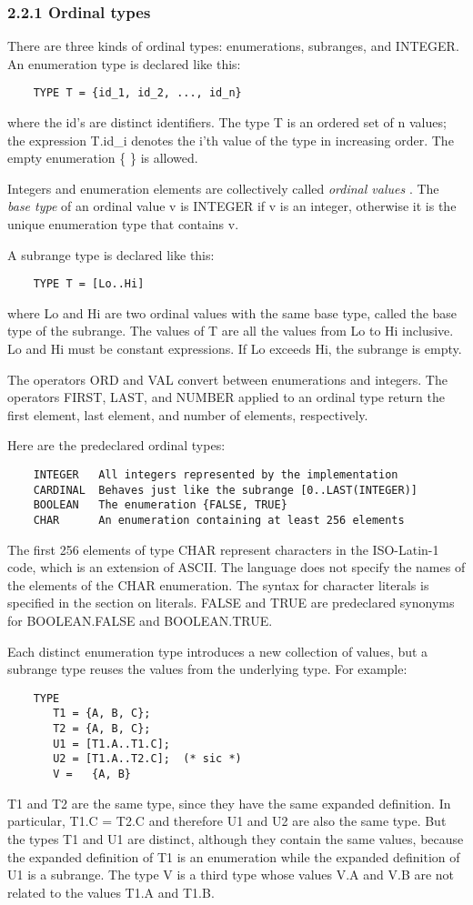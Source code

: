 \documentclass[10pt]{article}
\begin{document}
\subsubsection*{2.2.1 Ordinal types}

There are three kinds of ordinal types: enumerations, subranges, and
INTEGER.  An enumeration type is declared like this:
\begin{verbatim}
    TYPE T = {id_1, id_2, ..., id_n}
\end{verbatim}
where the id's are distinct identifiers.  The type T is an ordered set of n
values; the expression T.id\_i denotes the i'th value of the type in
increasing order.  The empty enumeration \{ \} is allowed.

Integers and enumeration elements are collectively called \emph{ordinal
  values} .  The \emph{base type} of an ordinal value v is INTEGER if v is an
integer, otherwise it is the unique enumeration type that contains v.

A subrange type is declared like this:
\begin{verbatim}
    TYPE T = [Lo..Hi]
\end{verbatim}
where Lo and Hi are two ordinal values with the same base type, called the
base type of the subrange.  The values of T are all the values from Lo to Hi
inclusive.  Lo and Hi must be constant expressions.  If Lo exceeds Hi, the
subrange is empty.

The operators ORD and VAL convert between enumerations and integers.  The
operators FIRST, LAST, and NUMBER applied to an ordinal type return the first
element, last element, and number of elements, respectively.

Here are the predeclared ordinal types:
\begin{verbatim}
    INTEGER   All integers represented by the implementation
    CARDINAL  Behaves just like the subrange [0..LAST(INTEGER)]
    BOOLEAN   The enumeration {FALSE, TRUE}
    CHAR      An enumeration containing at least 256 elements
\end{verbatim}
The first 256 elements of type CHAR represent characters in the ISO-Latin-1
code, which is an extension of ASCII.  The language does not specify the names
of the elements of the CHAR enumeration.  The syntax for character literals is
specified in the section on literals.  FALSE and TRUE are predeclared synonyms
for BOOLEAN.FALSE and BOOLEAN.TRUE.

Each distinct enumeration type introduces a new collection of values, but a
subrange type reuses the values from the underlying type.  For example:
\begin{verbatim}
    TYPE
       T1 = {A, B, C};
       T2 = {A, B, C};
       U1 = [T1.A..T1.C];
       U2 = [T1.A..T2.C];  (* sic *)
       V =   {A, B}
\end{verbatim}
T1 and T2 are the same type, since they have the same expanded definition.  In
particular, T1.C = T2.C and therefore U1 and U2 are also the same type.  But
the types T1 and U1 are distinct, although they contain the same values,
because the expanded definition of T1 is an enumeration while the expanded
definition of U1 is a subrange.  The type V is a third type whose values V.A
and V.B are not related to the values T1.A and T1.B.
\end{document}
